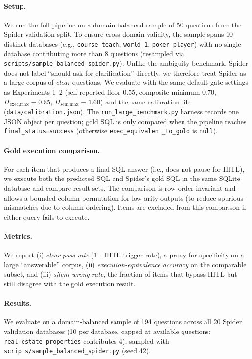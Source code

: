 \documentclass{article}
\begin{document}
\paragraph{Setup.}
We run the full pipeline on a domain-balanced sample of 50 questions from the Spider validation split. To ensure cross-domain validity, the sample spans 10 distinct databases (e.g., \texttt{course\_teach}, \texttt{world\_1}, \texttt{poker\_player}) with no single database contributing more than 8 questions (resampled via \texttt{scripts/sample\_balanced\_spider.py}).
Unlike the ambiguity benchmark, Spider does not label ``should ask for clarification'' directly; we therefore treat Spider as a large corpus of \emph{clear} questions.
We evaluate with the same default gate settings as Experiments 1--2
(self-reported floor $0.55$, composite minimum $0.70$,
$H_{\text{exec,max}}{=}0.85$, $H_{\text{sem,max}}{=}1.60$)
and the same calibration file (\texttt{data/calibration.json}).
The \texttt{run\_large\_benchmark.py} harness records one JSON object per
question; gold SQL is only compared when the pipeline reaches
\texttt{final\_status=success} (otherwise \texttt{exec\_equivalent\_to\_gold}
is \texttt{null}).

\paragraph{Gold execution comparison.}
For each item that produces a final SQL answer (i.e., does not pause for HITL),
we execute both the predicted SQL and Spider's gold SQL in the same SQLite
database and compare result sets.
The comparison is row-order invariant and allows a bounded column permutation
for low-arity outputs (to reduce spurious mismatches due to column ordering).
Items are excluded from this comparison if either query fails to execute.

\paragraph{Metrics.}
We report (i) \emph{clear-pass rate} (1 - HITL trigger rate), a proxy for
specificity on a large ``answerable'' corpus, (ii) \emph{execution-equivalence
accuracy} on the comparable subset, and (iii) \emph{silent wrong rate}, the
fraction of items that bypass HITL but still disagree with the gold execution
result.

\paragraph{Results.}
We evaluate on a domain-balanced sample of 194 questions across all 20
Spider validation databases (10 per database, capped at available questions;
\texttt{real\_estate\_properties} contributes 4), sampled with
\texttt{scripts/sample\_balanced\_spider.py} (seed 42).
\end{document}
